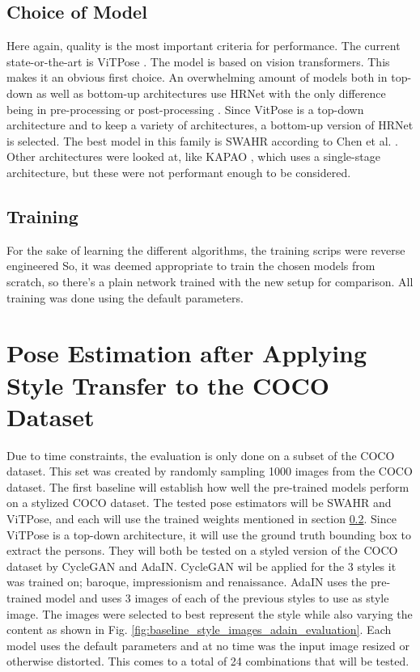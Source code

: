 \subsection{Choice of Model}
\label{sec:baseline_choice_pose_estimation}
Here again, quality is the most important criteria for performance.
The current state-or-the-art is ViTPose \cite{xu2023}.
The model is based on vision transformers.
This makes it an obvious first choice.
An overwhelming amount of models both in top-down as well as bottom-up architectures use HRNet \cite{Sun2019} with the only difference being in pre-processing \cite{Zhang2019, Huang2019} or post-processing \cite{Cheng2019, Geng2021}.
Since VitPose is a top-down architecture and to keep a variety of architectures, a bottom-up version of HRNet is selected.
The best model in this family is SWAHR according to Chen et al. \cite{chen2022}.
Other architectures were looked at, like KAPAO \cite{William2021}, which uses a single-stage architecture, but these were not performant enough to be considered.

\subsection{Training}
\label{sec:baseline_training_pose_estimation}
For the sake of learning the different algorithms, the training scrips were reverse engineered
So, it was deemed appropriate to train the chosen models from scratch, so there's a plain network trained with the new setup for comparison.
All training was done using the default parameters.

\section{Pose Estimation after Applying Style Transfer to the COCO Dataset}
\label{sec:baseline_coco_style_transfer}
Due to time constraints, the evaluation is only done on a subset of the COCO dataset.
This set was created by randomly sampling 1000 images from the COCO dataset.
The first baseline will establish how well the pre-trained models perform on a stylized COCO dataset.
The tested pose estimators will be SWAHR and ViTPose, and each will use the trained weights mentioned in section \ref{sec:baseline_training_pose_estimation}.
Since ViTPose is a top-down architecture, it will use the ground truth bounding box to extract the persons.
They will both be tested on a styled version of the COCO dataset by CycleGAN and AdaIN.
CycleGAN wil be applied for the 3 styles it was trained on; baroque, impressionism and renaissance.
AdaIN uses the pre-trained model and uses 3 images of each of the previous styles to use as style image.
The images were selected to best represent the style while also varying the content as shown in Fig. \ref{fig:baseline_style_images_adain_evaluation}.
Each model uses the default parameters and at no time was the input image resized or otherwise distorted.
This comes to a total of 24 combinations that will be tested.

